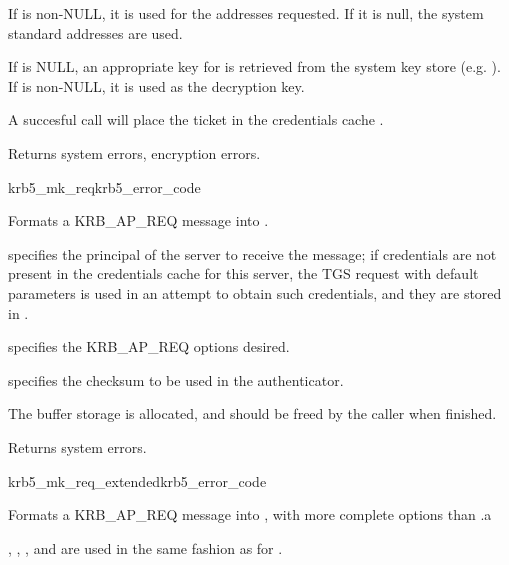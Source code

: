 If  is non-NULL, it is used for the addresses
requested.  If it is null, the system standard addresses are used.

If  is NULL, an appropriate key for
 is retrieved from the system key store (e.g.
).  If  is non-NULL, it is
used as the decryption key.

A succesful call will place the ticket in the credentials cache
.

Returns system errors, encryption errors.

\begin{funcdecl}{krb5_mk_req}{krb5_error_code}{\funcin}
\funcout
{}
\end{funcdecl}

Formats a KRB_AP_REQ message into .

 specifies the principal of the server to receive the
message; if credentials are not present in the credentials cache
 for this server, the TGS request with default
parameters is used in an attempt to obtain such credentials, and they
are stored in .

 specifies the KRB_AP_REQ options desired.

 specifies the checksum to be used in the authenticator.

The  buffer storage is allocated, and should be freed
by the caller when finished.

Returns system errors.


\begin{funcdecl}{krb5_mk_req_extended}{krb5_error_code}{\funcin}
\funcinout
{}
\funcout
{}
\end{funcdecl}

Formats a KRB_AP_REQ message into , with more complete
options than .a

, , ,
and  are used in the same fashion as for
.

